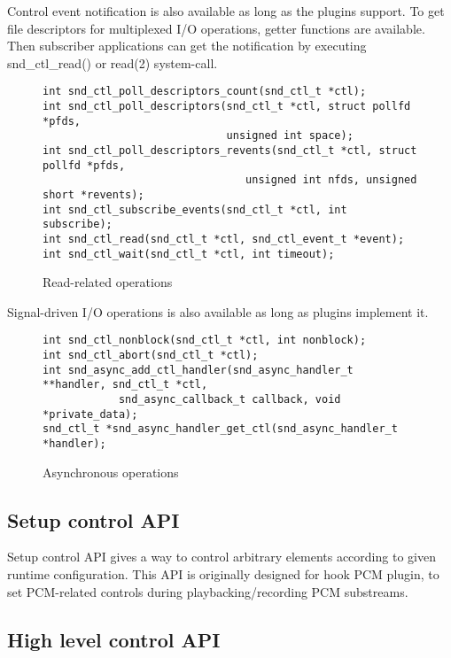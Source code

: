 \documentclass[onecolumn]{article}
\begin{document}
Control event notification is also available as long as the plugins support. To get file descriptors for multiplexed I/O operations, getter functions are available. Then subscriber applications can get the notification by executing snd\_ctl\_read() or read(2) system-call.

\begin{figure}[htbp]
\small
\begin{verbatim}
int snd_ctl_poll_descriptors_count(snd_ctl_t *ctl);
int snd_ctl_poll_descriptors(snd_ctl_t *ctl, struct pollfd *pfds,
                             unsigned int space);
int snd_ctl_poll_descriptors_revents(snd_ctl_t *ctl, struct pollfd *pfds,
                                unsigned int nfds, unsigned short *revents);
int snd_ctl_subscribe_events(snd_ctl_t *ctl, int subscribe);
int snd_ctl_read(snd_ctl_t *ctl, snd_ctl_event_t *event);
int snd_ctl_wait(snd_ctl_t *ctl, int timeout);
\end{verbatim}
\caption{{Read-related operations}}
\label{fig:read-related-operations}
\end{figure}

Signal-driven I/O operations is also available as long as plugins implement it.

\begin{figure}[htbp]
\small
\begin{verbatim}
int snd_ctl_nonblock(snd_ctl_t *ctl, int nonblock);
int snd_ctl_abort(snd_ctl_t *ctl);
int snd_async_add_ctl_handler(snd_async_handler_t **handler, snd_ctl_t *ctl, 
			snd_async_callback_t callback, void *private_data);
snd_ctl_t *snd_async_handler_get_ctl(snd_async_handler_t *handler);
\end{verbatim}
\caption{{Asynchronous operations}}
\label{fig:async-operations}
\end{figure}


\subsection{Setup control API}

Setup control API gives a way to control arbitrary elements according to given runtime configuration. This API is originally designed for hook PCM plugin, to set PCM-related controls during playbacking/recording PCM substreams.


\subsection{High level control API}
\end{document}
